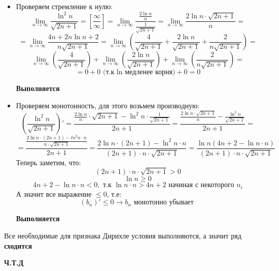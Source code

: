 \documentclass[a4paper,12pt]{article}
\begin{document}
\begin{itemize}
\item Проверяем стремление к нулю:
\[
\lim_{n \rightarrow \infty }\frac{\ln^2 n}{ \sqrt{2n + 1}} = \left[ \frac{\infty}{\infty} \right] = \lim_{n \rightarrow \infty } \frac{\frac{2\ln n}{n}}{\frac{1}{\sqrt{2n + 1}}} = \lim_{n \rightarrow \infty } \frac{2 \ln n \cdot \sqrt{2n + 1}}{n} = 
\]
\[
= \lim_{n \rightarrow \infty } \frac{4n +2 n \ln n + 2}{n \sqrt{2n + 1}} = \lim_{n \rightarrow \infty } \left( \frac{4}{ \sqrt{2n + 1}} + \frac{2 \ln n}{\sqrt{2n + 1}}+ \frac{2}{n \sqrt{2n + 1}}  \right) = 
\]
\[
 \lim_{n \rightarrow \infty } \left( \frac{4}{ \sqrt{2n + 1}} \right) +\lim_{n \rightarrow \infty } \left( \frac{2 \ln n}{\sqrt{2n + 1}} \right)+\lim_{n \rightarrow \infty } \left( \frac{2}{n \sqrt{2n + 1}}  \right) =
\] 
\[
= 0 + 0  \text{ (т.к ln медленее корня}) + 0  = 0
\]
\begin{center}
\textbf{Выполняется}
\end{center}
\item Проверяем монотонность, для этого возьмем производную:
\[
\left( \frac{\ln^2n}{\sqrt{2n + 1}} \right)' = \frac{\frac{2 \ln n}{n } \cdot \sqrt{2n + 1} - \ln^2 n \cdot \frac{1}{\sqrt{2n+1}}}{2n + 1} = \frac{\frac{2 \ln n \cdot \sqrt{2n + 1}}{n} - \frac{\ln^2 n }{\sqrt{2n + 1}}}{2n + 1} = 
\]
\[
= \frac{\frac{2\ln n \cdot (2n + 1) - ln^2 n \cdot n}{n \cdot \sqrt{2n + 1}}}{2n + 1} = \frac{2\ln n \cdot  (2n + 1) - \ln^2 n \cdot n}{(2n+1) \cdot n \cdot \sqrt{2n + 1}} = \frac{\ln n (4n + 2- \ln n \cdot n)}{(2n+1) \cdot n \cdot \sqrt{2n + 1}}
\]
Теперь заметим, что:
\[
(2n + 1) \cdot n \cdot \sqrt{2n + 1} > 0 
\]
\[
\ln n \geq 0 
\]
\[
4n + 2 - \ln n \cdot n < 0, \text{ т.к } \ln n \cdot n > 4n + 2 \text{ начиная с некоторого } n_i
\]
 А значит все выражение $\leq 0$,  т.е:
\[
(b_n)' \leq 0 \rightarrow b_n \text{ монотонно убывает }
\]
\begin{center}
\textbf{Выполняется}
\end{center}
\end{itemize}
Все необходимые для признака Дирихле условия выполняются, а значит ряд \textbf{сходится}
\begin{center}
\textbf{Ч.Т.Д} 
\end{center}










\clearpage
\end{document}

